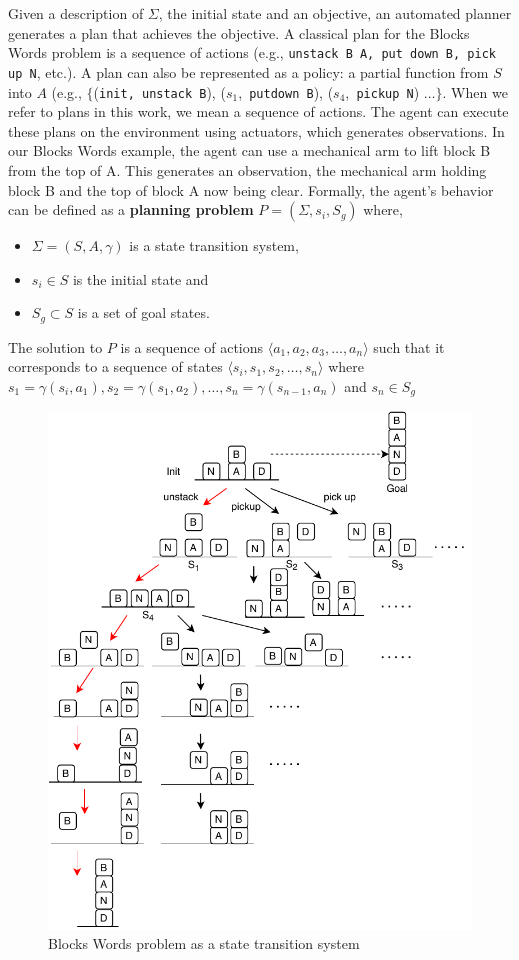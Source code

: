 Given a description of $\Sigma$, the initial state and an objective, an automated planner generates a plan that achieves the objective. A classical plan for the Blocks Words problem is a sequence of actions (e.g., \texttt{unstack B A, put down B, pick up N}, etc.). A plan can also be represented as a policy: a partial function from $S$ into $A$ (e.g.,  $\lbrace$(\texttt{init, unstack B}), ($s_1$,\texttt{ putdown B}), ($s_4$,\texttt{ pickup N}) $\ldots\rbrace$. When we refer to plans in this work, we mean a sequence of actions. The agent can execute these plans on the environment using actuators, which generates observations. In our Blocks Words example, the agent can use a mechanical arm to lift block B from the top of A. This generates an observation, the mechanical arm holding block B and the top of block A now being clear. Formally, the agent's behavior can be defined as a \textbf{planning problem} $P=(\Sigma, s_i, S_g)$ where, 
\begin{itemize}
\item $\Sigma=(S,A,\gamma)$ is a state transition system,
\item $s_i\in S$ is the initial state and
\item $S_g\subset S$ is a set of goal states.
\end{itemize}
\noindent The solution to $P$ is a sequence of actions $\langle a_1, a_2, a_3, \ldots, a_n\rangle$ such that it corresponds to a sequence of states $\langle s_i, s_1, s_2, \ldots, s_n\rangle$ where $s_1=\gamma(s_i,a_1), s_2=\gamma(s_1,a_2), \ldots, s_n=\gamma(s_{n-1},a_n)$ and $s_n \in S_g$

\begin{figure}[ht]
  \centering
\includegraphics[width=0.6\columnwidth]{img/bw.pdf}
  \caption{Blocks Words problem as a state transition system}
  \label{fig:blockswords}
\end{figure} 


